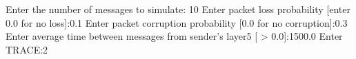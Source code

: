 
Enter the number of messages to simulate: 10
Enter  packet loss probability [enter 0.0 for no loss]:0.1
Enter packet corruption probability [0.0 for no corruption]:0.3
Enter average time between messages from sender's layer5 [ > 0.0]:1500.0
Enter TRACE:2
